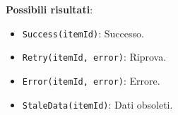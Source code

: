 \textbf{Possibili risultati}:
\begin{itemize}
    \item \texttt{Success(itemId)}: Successo.
    \item \texttt{Retry(itemId, error)}: Riprova.
    \item \texttt{Error(itemId, error)}: Errore.
    \item \texttt{StaleData(itemId)}: Dati obsoleti.
\end{itemize}